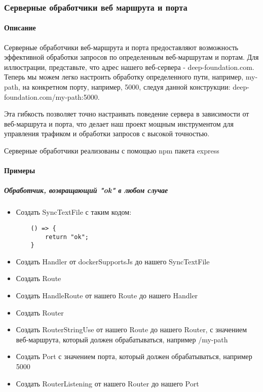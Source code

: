 \documentclass{article}
\begin{document}
\subsubsection{Серверные обработчики веб маршрута и порта}
\paragraph{Описание}
Серверные обработчики веб-маршрута и порта предоставляют возможность эффективной обработки запросов по определенным веб-маршрутам и портам. Для иллюстрации, представьте, что адрес нашего веб-сервера - deep-foundation.com. Теперь мы можем легко настроить обработку определенного пути, например, my-path, на конкретном порту, например, 5000, следуя данной конструкции: deep-foundation.com/my-path:5000.

Эта гибкость позволяет точно настраивать поведение сервера в зависимости от веб-маршрута и порта, что делает наш проект мощным инструментом для управления трафиком и обработки запросов с высокой точностью.

Серверные обработчики реализованы с помощью npm пакета express
\paragraph{Примеры}
\subparagraph{Обработчик, возвращающий "ok" в любом случае}
\begin{itemize}
  \item Создать SyncTextFile с таким кодом:
    \begin{verbatim}
    () => {
        return "ok";
    }
    \end{verbatim}
  \item Создать Handler от dockerSupportsJs до нашего SyncTextFile
  \item Создать Route
  \item Создать HandleRoute от нашего Route до нашего Handler
  \item Создать Router
  \item Создать RouterStringUse от нашего Route до нашего Router, с значением веб-маршрута, который должен обрабатываться, например /my-path
  \item Создать Port с значением порта, который должен обрабатываться, например 5000
  \item Создать RouterListening от нашего Router до нашего Port
\end{itemize}
\end{document}
